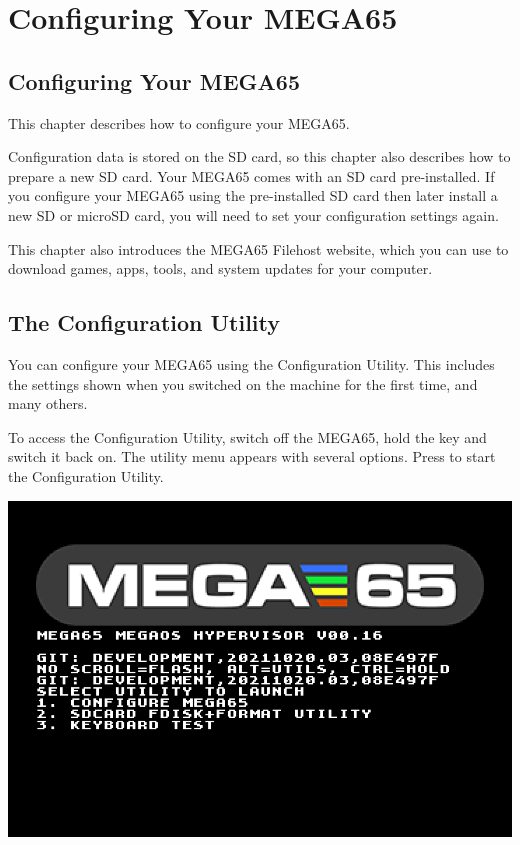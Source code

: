 \chapter{Configuring Your MEGA65}
\label{cha:configuringyourmega}

\section{Configuring Your MEGA65}

This chapter describes how to configure your MEGA65.

Configuration data is stored on the SD card, so this chapter also describes how to prepare a new SD card. Your MEGA65 comes with an SD card pre-installed. If you configure your MEGA65 using the pre-installed SD card then later install a new SD or microSD card, you will need to set your configuration settings again.

This chapter also introduces the MEGA65 Filehost website, which you can use to download games, apps, tools, and system updates for your computer.

\section{The Configuration Utility}
\label{sec:configuration-utility}

You can configure your MEGA65 using the Configuration Utility. This includes the settings shown when you switched on the machine for the first time, and many others.

To access the Configuration Utility, switch off the MEGA65, hold the  key and switch it back on. The utility menu appears with several options. Press  to start the Configuration Utility.

\begin{center}
  \includegraphics[width=0.7\linewidth]{images/ss-utilmenu.png}
\end{center}

